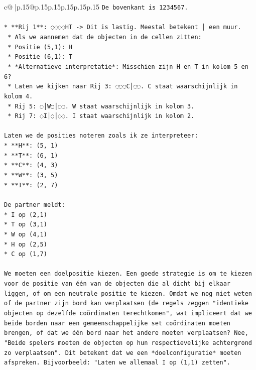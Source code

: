 \documentclass{article}
\begin{document}
{\begin{supertabular}{c@{$\;$}|p{.15\linewidth}@{}p{.15\linewidth}p{.15\linewidth}p{.15\linewidth}p{.15\linewidth}p{.15\linewidth}}
{{{\texttt{De bovenkant is 1234567.} \\
\\ 
\texttt{*   **Rij 1**: ◌◌◌◌HT {-}> Dit is lastig. Meestal betekent │ een muur.} \\
\texttt{    *   Als we aannemen dat de objecten in de cellen zitten:} \\
\texttt{    *   Positie (5,1): H} \\
\texttt{    *   Positie (6,1): T} \\
\texttt{    *   *Alternatieve interpretatie*: Misschien zijn H en T in kolom 5 en 6?} \\
\texttt{    *   Laten we kijken naar Rij 3: ◌◌◌C│◌◌. C staat waarschijnlijk in kolom 4.} \\
\texttt{    *   Rij 5: ◌│W◌│◌◌. W staat waarschijnlijk in kolom 3.} \\
\texttt{    *   Rij 7: ◌I│◌│◌◌. I staat waarschijnlijk in kolom 2.} \\
\\ 
\texttt{Laten we de posities noteren zoals ik ze interpreteer:} \\
\texttt{*   **H**: (5, 1)} \\
\texttt{*   **T**: (6, 1)} \\
\texttt{*   **C**: (4, 3)} \\
\texttt{*   **W**: (3, 5)} \\
\texttt{*   **I**: (2, 7)} \\
\\ 
\texttt{De partner meldt:} \\
\texttt{*   I op (2,1)} \\
\texttt{*   T op (3,1)} \\
\texttt{*   W op (4,1)} \\
\texttt{*   H op (2,5)} \\
\texttt{*   C op (1,7)} \\
\\ 
\texttt{We moeten een doelpositie kiezen. Een goede strategie is om te kiezen voor de positie van één van de objecten die al dicht bij elkaar liggen, of om een neutrale positie te kiezen. Omdat we nog niet weten of de partner zijn bord kan verplaatsen (de regels zeggen "identieke objecten op dezelfde coördinaten terechtkomen", wat impliceert dat we beide borden naar een gemeenschappelijke set coördinaten moeten brengen, of dat we één bord naar het andere moeten verplaatsen? Nee, "Beide spelers moeten de objecten op hun respectievelijke achtergrond zo verplaatsen". Dit betekent dat we een *doelconfiguratie* moeten afspreken. Bijvoorbeeld: "Laten we allemaal I op (1,1) zetten".} \\
}}}
\end{supertabular}}
\end{document}
